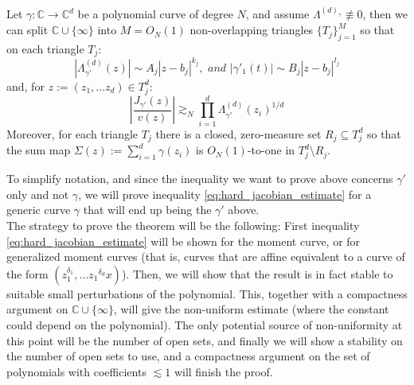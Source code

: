 
	\begin{thm}
	\label{lem:geometric_lemma}
		Let $\gamma:\mathbb C \to \mathbb C^d$ be a polynomial curve of degree $N$, and assume $\Lambda^{(d)_\gamma} \not \equiv 0$, then we can split $\mathbb C \cup \{\infty\}$ into $M = O_{N}(1)$ non-overlapping triangles $\{T_j\}_{j=1}^M$ so that on each triangle $T_j$:
		\begin{equation}
		\label{eq:power_geometric_estimates}
			|\Lambda_{\gamma'}^{(d)}(z)| \sim A_j |z-b_j|^{k_j}, \,\, and \,\, |\gamma'_1(t)|\sim B_j|z-b_j|^{l_j}
		\end{equation}
		and, for $z := (z_1, \dots z_d) \in T_j^d$:
		\begin{equation}
			\tag{DW}
			\label{eq:hard_jacobian_estimate}
			\left|\frac{J_{\gamma'}(z)}{v(z)}\right|\gtrsim_N \prod_{i=1}^d \Lambda^{(d)}_{\gamma'}(z_i)^{1/d}
		\end{equation}
		Moreover, for each triangle $T_j$ there is a closed, zero-measure set $R_j \subseteq T_j^d$ so that the sum map $\Sigma(z):=\sum_{i=1}^d \gamma(z_i)$ is $O_N(1)$-to-one in $T_j^d\setminus R_j$.
	\end{thm}


	To simplify notation, and since the inequality we want to prove above concerns $\gamma'$ only and not $\gamma$, we will prove inequality \eqref{eq:hard_jacobian_estimate} for a generic curve $\gamma$ that will end up being the $\gamma'$ above.\\

	The strategy to prove the theorem will be the following: First inequality \eqref{eq:hard_jacobian_estimate} will be shown for the moment curve, or for generalized moment curves (that is, curves that are affine equivalent to a curve of the form $(z_1^{\delta_1}, \dots z_1{^{\delta_d}}x)$). Then, we will show  that the result is in fact stable to suitable small perturbations of the polynomial. This, together with a compactness argument on $\mathbb C \cup \{\infty\}$, will give the non-uniform estimate (where the constant could depend on the polynomial). The only potential source of non-uniformity at this point will be the number of open sets, and finally we will show a stability on the number of open sets to use, and a compactness argument on the set of polynomials with coefficients $\lesssim 1$ will finish the proof.

